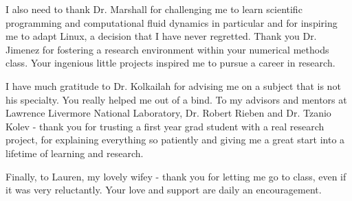 \documentclass[12pt]{ucthesis}
\begin{document}
\begin{frontmatter}
\begin{acknowledgements}
  I also need to thank Dr. Marshall for challenging me to learn scientific programming and computational fluid dynamics in particular and for inspiring me to adapt Linux, a decision that I have never regretted. Thank you Dr. Jimenez for fostering a research environment within your numerical methods class. Your ingenious little projects inspired me to pursue a career in research. 

  I have much gratitude to Dr. Kolkailah for advising me on a subject that is not his specialty. You really helped me out of a bind. To my advisors and mentors at Lawrence Livermore National Laboratory, Dr. Robert Rieben and Dr. Tzanio Kolev - thank you for trusting a first year grad student with a real research project, for explaining everything so patiently and giving me a great start into a lifetime of learning and research.

  Finally, to Lauren, my lovely wifey - thank you for letting me go to class, even if it was very reluctantly. Your love and support are daily an encouragement. 

\end{acknowledgements}


\tableofcontents


\listoftables

\listoffigures


\end{frontmatter}
\end{document}
